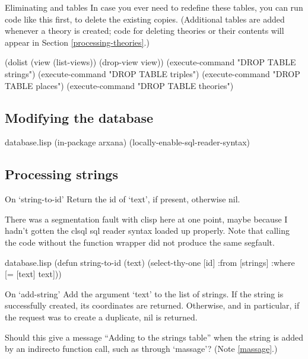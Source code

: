 \begin{notate}{Eliminating and tables}
In case you ever need to redefine these tables, you can
run code like this first, to delete the existing copies.
(Additional tables are added whenever a theory is created;
code for deleting theories or their contents will appear
in Section \ref{processing-theories}.)
\end{notate}

\begin{idea}
(dolist (view (list-views)) (drop-view view))
(execute-command "DROP TABLE strings")
(execute-command "DROP TABLE triples")
(execute-command "DROP TABLE places")
(execute-command "DROP TABLE theories")
\end{idea}

\subsection{Modifying the database}

\begin{common}{database.lisp}
(in-package arxana)
(locally-enable-sql-reader-syntax)
\end{common}

\subsection*{Processing strings}

\begin{notate}{On `string-to-id'}
Return the id of `text', if present, otherwise nil.

There was a segmentation fault with clisp here at one
point, maybe because I hadn't gotten the clsql sql reader
syntax loaded up properly.  Note that calling the code
without the function wrapper did not produce the same
segfault.
\end{notate}

\begin{common}{database.lisp}
(defun string-to-id (text)
  (select-thy-one [id]
                  :from [strings]
                  :where [= [text] text]))
\end{common}

\begin{notate}{On `add-string'} \label{add-string}
Add the argument `text' to the list of strings.  If the string
is successfully created, its coordinates are returned.
Otherwise, and in particular, if the request was to create
a duplicate, nil is returned.

Should this give a message ``Adding  to the
strings table'' when the string is added by an indirecto
function call, such as through `massage'?
(Note \ref{massage}.)
\end{notate}

